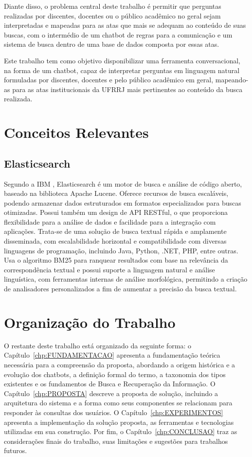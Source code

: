 Diante disso, o problema central deste trabalho é permitir que perguntas realizadas por discentes, docentes ou o público acadêmico no geral sejam interpretadas e mapeadas para as atas que mais se adequam ao conteúdo de suas buscas, com o intermédio de um chatbot de regras para a comunicação e um sistema de busca dentro de uma base de dados composta por essas atas.

Este trabalho tem como objetivo disponibilizar uma ferramenta conversacional, na forma de um chatbot, capaz de interpretar perguntas em linguagem natural formuladas por discentes, docentes e pelo público acadêmico em geral, mapeando-as para as atas institucionais da UFRRJ mais pertinentes ao conteúdo da busca realizada.

\section{Conceitos Relevantes}

\subsection{Elasticsearch}
Segundo a IBM \cite{IBMElasticsearch}, Elasticsearch é um motor de busca e análise de código aberto, baseado na biblioteca Apache Lucene. Oferece recursos de busca escaláveis, podendo armazenar dados estruturados em formatos especializados para buscas otimizadas. Possui também um design de API RESTful, o que proporciona flexibilidade para a análise de dados e facilidade para a integração com aplicações. Trata-se de uma solução de busca textual rápida e amplamente disseminada, com escalabilidade horizontal e compatibilidade com diversas linguagens de programação, incluindo Java, Python, .NET, PHP, entre outras. Usa o algoritmo BM25 para ranquear resultados com base na relevância da correspondência textual e possui suporte a linguagem natural e análise linguística, com ferramentas internas de análise morfológica, permitindo a criação de analisadores personalizados a fim de aumentar a precisão da busca textual.

\section{Organização do Trabalho}

O restante deste trabalho está organizado da seguinte forma: o Capítulo~\ref{chp:FUNDAMENTACAO} apresenta a fundamentação teórica necessária para a compreensão da proposta, abordando a origem histórica e a evolução dos chatbots, a definição formal do termo, a taxonomia dos tipos existentes e os fundamentos de Busca e Recuperação da Informação. O Capítulo~\ref{chp:PROPOSTA} descreve a proposta de solução, incluindo a arquitetura do sistema e a forma como seus componentes se relacionam para responder às consultas dos usuários. O Capítulo~\ref{chp:EXPERIMENTOS} apresenta a implementação da solução proposta, as ferramentas e tecnologias utilizadas em sua construção. Por fim, o Capítulo~\ref{chp:CONCLUSAO} traz as considerações finais do trabalho, suas limitações e sugestões para trabalhos futuros.
